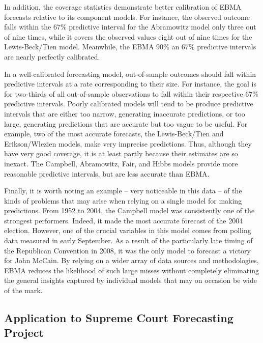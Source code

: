 \documentclass[pdftex,12pt,fullpage,oneside]{amsart}
\begin{document}
 In addition, the coverage statistics demonstrate better calibration
 of EBMA forecasts relative to its component models.  For instance,
 the observed outcome falls within the 67\% predictive interval for
 the Abramowitz model only three out of nine times, while it covers the
 observed values eight out of nine times for the Lewis-Beck/Tien
 model.  Meanwhile, the EBMA 90\% an 67\% predictive intervals are
 nearly perfectly calibrated.

 In a well-calibrated forecasting model, out-of-sample outcomes should
 fall within predictive intervals at a rate corresponding to their
 size.  For instance, the goal is for two-thirds of all out-of-sample
 observations to fall within their respective 67\% predictive
 intervals.  Poorly calibrated models will tend to be produce
 predictive intervals that are either too narrow, generating
 inaccurate predictions, or too large, generating predictions that are
 accurate but too vague to be useful. For example, two of the
 most %
 accurate forecasts, the Lewis-Beck/Tien and Erikson/Wlezien
 models, %
 make very imprecise predictions.  Thus, although they have very good
 coverage, it is at least partly because their estimates are so
 inexact.  The Campbell, Abramowitz, Fair, and Hibbs models provide
 more reasonable predictive intervals, but are less accurate than
 EBMA.


 Finally, it is worth noting an example -- very noticeable in this
 data -- of the kinds of problems that may arise when relying on a
 single model for making predictions.  From 1952 to 2004, the Campbell
 model was consistently one of the strongest performers.  Indeed, it
 made the most accurate forecast of the 2004 election.  However, one
 of the crucial variables in this model comes from polling data
 measured in early September.  As a result of the particularly late
 timing of the Republican Convention in 2008, it was the only model to
 forecast a victory for John McCain.  By relying on a wider array of
 data sources and methodologies, EBMA reduces the likelihood of such
 large misses without completely eliminating the general insights
 captured by individual models that may on occasion be wide of the
 mark.


\subsection{Application to Supreme Court Forecasting Project}
\end{document}
